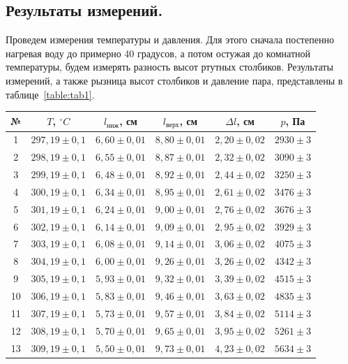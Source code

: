 \documentclass[a4paper,11pt]{article}
\begin{document}
\subsection{Результаты измерений.}
Проведем измерения температуры и давления. Для этого сначала постепенно нагревая воду до примерно 40 градусов, а потом остужая до комнатной температуры, будем измерять разность высот ртутных столбиков. Результаты измерений, а также рызница высот столбиков и давление пара, представлены в таблице~\ref{table:tab1}.
\begin{table}[h!]
\centering
\begin{tabular}{ ||c|c|c|c|c|c|| }
  \hline
  №  & $T$, $^{\circ}C$  & $l_{ниж}$, см   & $l_{верх}$, см    & $\Delta l$, см  & $p$, Па \\
  \hline
  1  & $297,19 \pm 0,1$ & $6,60 \pm 0,01$ & $8,80 \pm 0,01$  & $2,20 \pm 0,02$ & $2930 \pm 3$ \\
  2  & $298,19 \pm 0,1$ & $6,55 \pm 0,01$ & $8,87 \pm 0,01$  & $2,32 \pm 0,02$ & $3090 \pm 3$ \\
  3  & $299,19 \pm 0,1$ & $6,48 \pm 0,01$ & $8,92 \pm 0,01$  & $2,44 \pm 0,02$ & $3250 \pm 3$ \\
  4  & $300,19 \pm 0,1$ & $6,34 \pm 0,01$ & $8,95 \pm 0,01$  & $2,61 \pm 0,02$ & $3476 \pm 3$ \\
  5  & $301,19 \pm 0,1$ & $6,24 \pm 0,01$ & $9,00 \pm 0,01$  & $2,76 \pm 0,02$ & $3676 \pm 3$ \\
  6  & $302,19 \pm 0,1$ & $6,14 \pm 0,01$ & $9,09 \pm 0,01$  & $2,95 \pm 0,02$ & $3929 \pm 3$ \\
  7  & $303,19 \pm 0,1$ & $6,08 \pm 0,01$ & $9,14 \pm 0,01$  & $3,06 \pm 0,02$ & $4075 \pm 3$ \\
  8  & $304,19 \pm 0,1$ & $6,00 \pm 0,01$ & $9,26 \pm 0,01$  & $3,26 \pm 0,02$ & $4342 \pm 3$ \\
  9  & $305,19 \pm 0,1$ & $5,93 \pm 0,01$ & $9,32 \pm 0,01$  & $3,39 \pm 0,02$ & $4515 \pm 3$ \\
  10 & $306,19 \pm 0,1$ & $5,83 \pm 0,01$ & $9,46 \pm 0,01$  & $3,63 \pm 0,02$ & $4835 \pm 3$ \\
  11 & $307,19 \pm 0,1$ & $5,73 \pm 0,01$ & $9,57 \pm 0,01$  & $3,84 \pm 0,02$ & $5114 \pm 3$ \\
  12 & $308,19 \pm 0,1$ & $5,70 \pm 0,01$ & $9,65 \pm 0,01$  & $3,95 \pm 0,02$ & $5261 \pm 3$ \\
  13 & $309,19 \pm 0,1$ & $5,50 \pm 0,01$ & $9,73 \pm 0,01$  & $4,23 \pm 0,02$ & $5634 \pm 3$ \\

\end{tabular}
\end{table}
\end{document}

